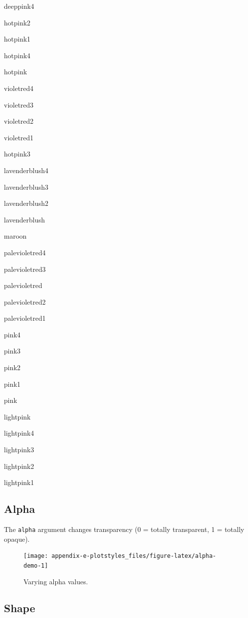 \documentclass[
  oneside]{book}
\begin{document}
{deeppink4}

{hotpink2}

{hotpink1}

{hotpink4}

{hotpink}

{violetred4}

{violetred3}

{violetred2}

{violetred1}

{hotpink3}

{lavenderblush4}

{lavenderblush3}

{lavenderblush2}

{lavenderblush}

{maroon}

{palevioletred4}

{palevioletred3}

{palevioletred}

{palevioletred2}

{palevioletred1}

{pink4}

{pink3}

{pink2}

{pink1}

{pink}

{lightpink}

{lightpink4}

{lightpink3}

{lightpink2}

{lightpink1}

\hypertarget{alpha-1}{%
\subsection{Alpha}\label{alpha-1}}

The \texttt{alpha} argument changes transparency (0 = totally transparent, 1 = totally opaque).

\begin{figure}

{\centering \texttt{[image: appendix-e-plotstyles\_files/figure-latex/alpha-demo-1]} 

}

\caption{Varying alpha values.}\label{fig:alpha-demo}
\end{figure}

\hypertarget{shape}{%
\subsection{Shape}\label{shape}}
\end{document}
